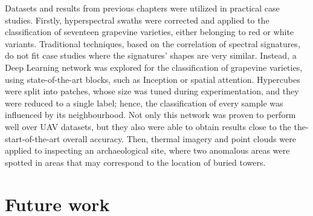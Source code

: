 Datasets and results from previous chapters were utilized in practical case studies. Firstly, hyperspectral swaths were corrected and applied to the classification of seventeen grapevine varieties, either belonging to red or white variants. Traditional techniques, based on the correlation of spectral signatures, do not fit case studies where the signatures' shapes are very similar. Instead, a Deep Learning network was explored for the classification of grapevine varieties, using state-of-the-art blocks, such as Inception or spatial attention. Hypercubes were split into patches, whose size was tuned during experimentation, and they were reduced to a single label; hence, the classification of every sample was influenced by its neighbourhood. Not only this network was proven to perform well over UAV datasets, but they also were able to obtain results close to the the-start-of-the-art overall accuracy. Then, thermal imagery and point clouds were applied to inspecting an archaeological site, where two anomalous areas were spotted in areas that may correspond to the location of buried towers. 

\section{Future work}

